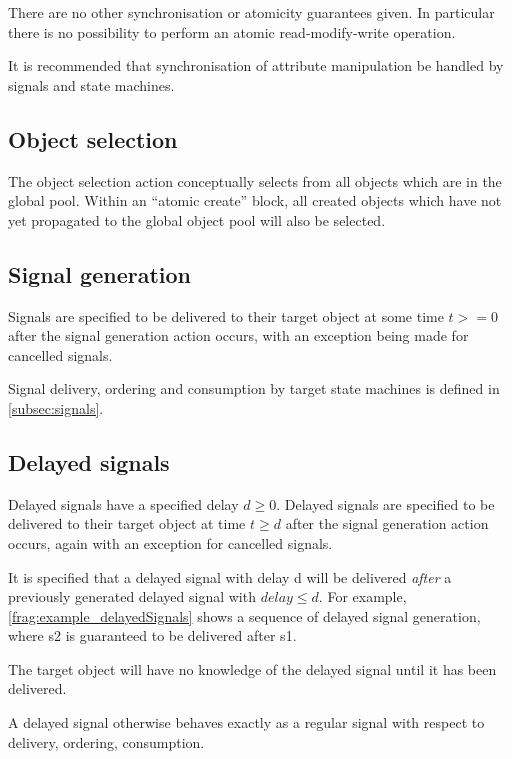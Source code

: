 There are no other synchronisation or atomicity guarantees given. In particular
there is no possibility to perform an atomic read-modify-write operation.

It is recommended that synchronisation of attribute manipulation be
handled by signals and state machines.


\subsection{Object selection}
\label{sec:selectAction}

The object selection action conceptually selects from all objects which are in
the global pool. Within an ``atomic create'' block, all created objects which
have not yet propagated to the global object pool will also be selected.

\subsection{Signal generation}
Signals are specified to be delivered to their target object at some time
$t >= 0$ after the signal generation action occurs, with an exception being made
for cancelled signals.

Signal delivery, ordering and consumption by target state machines is defined
in \ref{subsec:signals}.

\subsection{Delayed signals}
Delayed signals have a specified delay $d \geq 0$. Delayed signals are specified to
be delivered to their target object at time $t \geq d$ after the signal generation
action occurs, again with an exception for cancelled signals.

It is specified that a delayed signal with delay d will be delivered
\emph{after} a previously generated delayed signal with $delay \leq d$. For example,
\ref{frag:example_delayedSignals} shows a sequence of delayed signal generation,
where s2 is guaranteed to be delivered after s1.


The target object will have no knowledge of the delayed signal until it has
been delivered.

A delayed signal otherwise behaves exactly as a regular signal with respect
to delivery, ordering, consumption.

